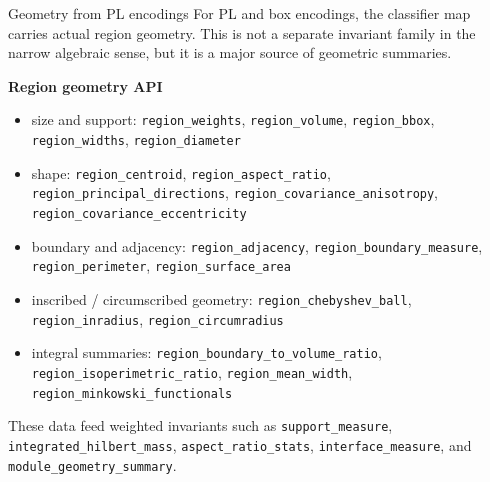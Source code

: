 \documentclass[aspectratio=169,11pt]{beamer}
\begin{document}
\begin{frame}{Geometry from PL encodings}
\small
For PL and box encodings, the classifier map carries actual region geometry.
This is not a separate invariant family in the narrow algebraic sense, but it is a major source of geometric summaries.

\medskip
\textbf{Region geometry API}
\begin{itemize}
  \item size and support: \texttt{region\_weights}, \texttt{region\_volume}, \texttt{region\_bbox}, \texttt{region\_widths}, \texttt{region\_diameter}
  \item shape: \texttt{region\_centroid}, \texttt{region\_aspect\_ratio}, \texttt{region\_principal\_directions}, \texttt{region\_covariance\_anisotropy}, \texttt{region\_covariance\_eccentricity}
  \item boundary and adjacency: \texttt{region\_adjacency}, \texttt{region\_boundary\_measure}, \texttt{region\_perimeter}, \texttt{region\_surface\_area}
  \item inscribed / circumscribed geometry: \texttt{region\_chebyshev\_ball}, \texttt{region\_inradius}, \texttt{region\_circumradius}
  \item integral summaries: \texttt{region\_boundary\_to\_volume\_ratio}, \texttt{region\_isoperimetric\_ratio}, \texttt{region\_mean\_width}, \texttt{region\_minkowski\_functionals}
\end{itemize}

\medskip
These data feed weighted invariants such as \texttt{support\_measure},
\texttt{integrated\_hilbert\_mass}, \texttt{aspect\_ratio\_stats},
\texttt{interface\_measure}, and \texttt{module\_geometry\_summary}.
\end{frame}
\end{document}
